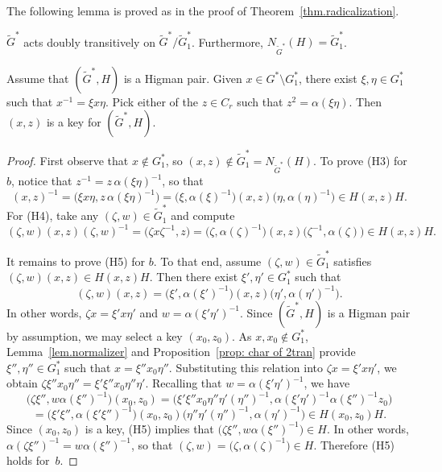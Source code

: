 The following lemma is proved as in the proof of Theorem~\ref{thm.radicalization}.

\begin{lemma}
\label{lem.normalizer}
$\widetilde{G}^*$ acts doubly transitively on $\widetilde{G}^*/\widetilde{G}_1^*$. Furthermore, $N_{\widetilde{G}^*}(H) = \widetilde{G}_1^*$.
\end{lemma}


\begin{lemma}
\label{lem.key finder}
Assume that $(\widetilde{G}^*, H)$ is a Higman pair.
Given $x \in G^* \setminus G^*_1$, there exist $\xi, \eta \in G_1^*$ such that $x^{-1} = \xi x \eta$.
Pick either of the $z \in C_r$ such that $z^2 = \alpha(\xi\eta)$.
Then $(x,z)$ is a key for $(\widetilde{G}^*,H)$.
\end{lemma}

\begin{proof}
First observe that $x \notin G_1^*$, so $(x,z) \notin \widetilde{G}_1^* = N_{\widetilde{G}^*}(H)$.
To prove (H3) for $b$, notice that $z^{-1} = z\,\alpha(\xi\eta)^{-1}$, so that
\begin{equation}
\label{eq:H3}
(x,z)^{-1}
= \bigl(\xi x \eta, z\, \alpha(\xi \eta)^{-1}\bigr)
=\bigl( \xi, \alpha(\xi)^{-1} \bigr) (x,z) \bigl( \eta, \alpha(\eta)^{-1} \bigr)
\in H(x,z)H.
\end{equation}
For (H4), take any $(\zeta, w) \in \widetilde{G}_1^*$ and compute
\begin{equation}
\label{eq:H4}
(\zeta,w)(x,z)(\zeta,w)^{-1}
= \bigl(\zeta x \zeta^{-1}, z\bigr)
=\bigl( \zeta, \alpha(\zeta)^{-1} \bigr)(x,z)\bigl(\zeta^{-1},\alpha(\zeta) \bigr)
\in H(x,z)H.
\end{equation}

It remains to prove (H5) for $b$. 
To that end, assume $(\zeta, w) \in \widetilde{G}_1^*$ satisfies $(\zeta,w)(x,z) \in H(x,z)H$.
Then there exist $\xi',\eta' \in G_1^*$ such that 
\[ (\zeta,w)(x,z) = \bigl( \xi', \alpha(\xi')^{-1} \bigr) (x,z) \bigl( \eta', \alpha(\eta')^{-1} \bigr). \]
In other words, $\zeta x = \xi' x \eta'$ and $w = \alpha(\xi' \eta')^{-1}$.
Since $(\widetilde{G}^*,H)$ is a Higman pair by assumption, we may select a key $(x_0,z_0)$.
As $x,x_0 \notin G_1^*$, Lemma~\ref{lem.normalizer} and Proposition~\ref{prop: char of 2tran} provide $\xi'', \eta'' \in G_1^*$ such that $x = \xi'' x_0 \eta''$.
Substituting this relation into $\zeta x = \xi' x \eta'$, we obtain $\zeta \xi'' x_0 \eta'' = \xi' \xi'' x_0 \eta'' \eta'$.
Recalling that $w = \alpha(\xi' \eta')^{-1}$, we have
\[
\bigl(\zeta \xi'', w \alpha(\xi'')^{-1}\bigr)(x_0,z_0)
= \bigl(\xi' \xi'' x_0 \eta'' \eta' (\eta'')^{-1}, \alpha(\xi' \eta')^{-1} \alpha(\xi'')^{-1} z_0 \bigr)
\]
\[
= \bigl( \xi' \xi'', \alpha(\xi' \xi'')^{-1} \bigr)
(x_0,z_0)
\bigl(\eta'' \eta' (\eta'')^{-1}, \alpha(\eta')^{-1}\bigr)
\in H(x_0,z_0)H.
\]
Since $(x_0,z_0)$ is a key, (H5) implies that $\bigl(\zeta \xi'', w \alpha(\xi'')^{-1}\bigr) \in H$.
In other words, $\alpha(\zeta \xi'')^{-1} = w \alpha(\xi'')^{-1}$, so that $(\zeta,w) = \bigl( \zeta, \alpha(\zeta)^{-1} \bigr) \in H$.
Therefore (H5) holds for~$b$.
\end{proof}


